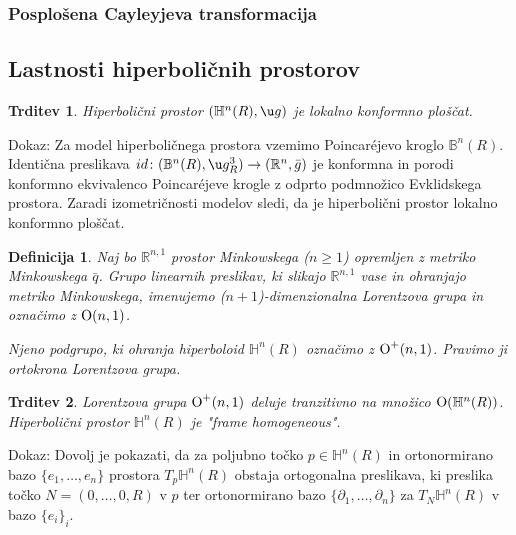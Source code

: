 \documentclass[a4paper]{article}
\newtheorem{definicija}{Definicija}
\newtheorem{trditev}{Trditev}
\begin{document}
\subsubsection{Posplošena Cayleyjeva transformacija}

\subsection{Lastnosti hiperboličnih prostorov}

\begin{trditev}
Hiperbolični prostor $(\mathbb{H}^{n}(R), \u g)$ je lokalno konformno ploščat.
\end{trditev}

Dokaz:
Za model hiperboličnega prostora vzemimo Poincar\'ejevo kroglo  $\mathbb{B}^{n}(R)$. Identična preslikava $id \colon (\mathbb{B}^{n}(R), \u g_{R}^{3}) \to (\mathbb{R}^{n}, \bar{g})$ je konformna in porodi konformno ekvivalenco Poincar\'ejeve krogle z odprto podmnožico Evklidskega prostora. Zaradi izometričnosti modelov sledi, da je hiperbolični prostor lokalno konformno ploščat.

\begin{definicija}
Naj bo $\mathbb{R}^{n,1}$ prostor Minkowskega ($n \geq 1$) opremljen z metriko Minkowskega $\bar{q}$. Grupo linearnih preslikav, ki slikajo $\mathbb{R}^{n,1}$ vase in ohranjajo metriko Minkowskega, imenujemo \emph{($n+1$)-dimenzionalna Lorentzova grupa} in označimo z $\textup{O}(n,1)$.

Njeno podgrupo, ki ohranja hiperboloid $\mathbb{H}^{n}(R)$ označimo z $\textup{O}^{+}(n,1)$. Pravimo ji \emph{ortokrona Lorentzova grupa}.
\end{definicija}

\begin{trditev}
Lorentzova grupa $\textup{O}^{+}(n,1)$ deluje tranzitivno na množico $\textup{O}(\mathbb{H}^{n}(R))$. Hiperbolični prostor $\mathbb{H}^{n}(R)$ je "frame homogeneous".
\end{trditev}

Dokaz:
Dovolj je pokazati, da za poljubno točko $p \in \mathbb{H}^{n}(R)$ in ortonormirano bazo $\{e_{1}, \dots , e_{n} \}$ prostora $T_{p}\mathbb{H}^{n}(R)$ obstaja ortogonalna preslikava, ki preslika točko $N=(0, \dots , 0, R)$ v $p$ ter ortonormirano bazo $\{\partial_{1}, \dots , \partial_{n} \}$ za $T_{N}\mathbb{H}^{n}(R)$ v bazo $\{e_{i}\}_{i}$.
\end{document}

